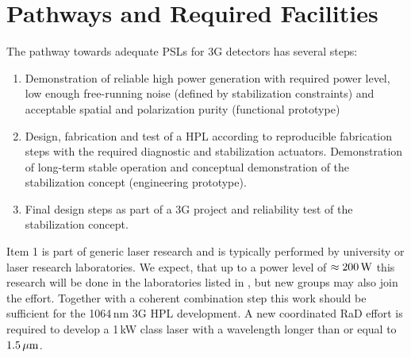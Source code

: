 %


\section{Pathways and Required Facilities} \label{sec:pathway}
The pathway towards adequate \acp{PSL} for \ac{3G}   detectors has several steps:
\begin{enumerate}
	\item Demonstration of reliable high power generation with required power level, low enough free-running noise (defined by stabilization constraints) and acceptable spatial and polarization purity (functional prototype)
	\item Design, fabrication and test of a \ac{HPL} according to reproducible fabrication steps with the required diagnostic and stabilization actuators. Demonstration of long-term stable operation and conceptual demonstration of the stabilization concept (engineering prototype).
	\item Final design steps as part of a \ac{3G}   project and reliability test of the stabilization concept.
\end{enumerate}

\noindent Item 1 is part of generic laser research and is typically performed by university or laser research laboratories. We expect, that up to a power level of $ \approx 200 \, {\rm W} $ this research will be done in the laboratories listed in \cite{LightSource_RD_table}, but new groups may also join the effort. Together with a coherent combination step this work should be sufficient for the 1064\,nm \ac{3G}   \ac{HPL} development.
A new coordinated \ac{RaD} effort is required to develop a 1\,kW class laser with a wavelength longer than or equal to $ 1.5\, {\rm \mu m}$.

